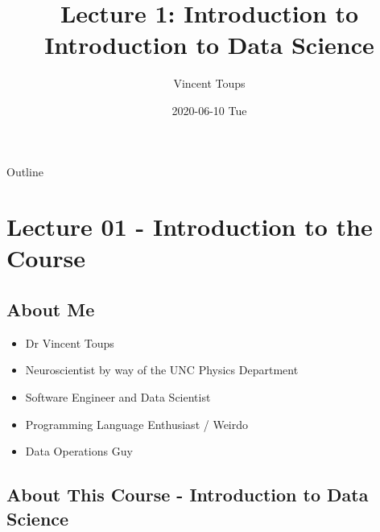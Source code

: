 \documentclass[bigger]{beamer}
\author{Vincent Toups}
\date{2020-06-10 Tue}
\title{Lecture 1: Introduction to Introduction to Data Science}
\begin{document}
\maketitle
\begin{frame}{Outline}
\tableofcontents
\end{frame}


\section{Lecture 01 - Introduction to the Course}
\label{sec:orgfd11ce5}

\subsection{About Me}
\label{sec:org8b1bf4b}

\begin{itemize}
\item Dr Vincent Toups
\item Neuroscientist by way of the UNC Physics Department
\item Software Engineer and Data Scientist
\item Programming Language Enthusiast / Weirdo
\item Data Operations Guy
\end{itemize}

\subsection{About This Course - Introduction to Data Science}
\label{sec:orgcf5e1d7}
\end{document}
